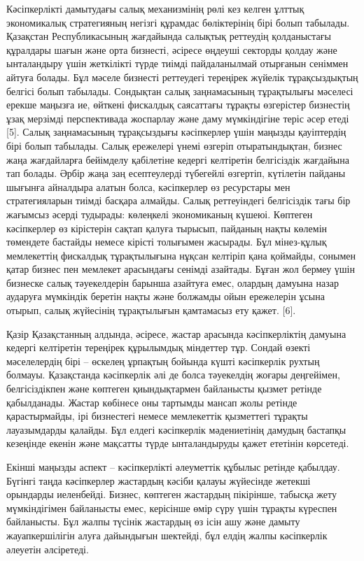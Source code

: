 \begin{multicols}{2}
Кәсіпкерлікті дамытудағы салық механизмінің рөлі кез келген ұлттық
экономикалық стратегияның негізгі құрамдас бөліктерінің бірі болып
табылады. Қазақстан Республикасының жағдайында салықтық реттеудің
қолданыстағы құралдары шағын және орта бизнесті, әсіресе өңдеуші
секторды қолдау және ынталандыру үшін жеткілікті түрде тиімді
пайдаланылмай отырғанын сеніммен айтуға болады. Бұл мәселе бизнесті
реттеудегі тереңірек жүйелік тұрақсыздықтың белгісі болып табылады.
Сондықтан салық заңнамасының тұрақтылығы мәселесі ерекше маңызға ие,
өйткені фискалдық саясаттағы тұрақты өзгерістер бизнестің ұзақ мерзімді
перспективада жоспарлау және даму мүмкіндігіне теріс әсер етеді {[}5{]}.
Салық заңнамасының тұрақсыздығы кәсіпкерлер үшін маңызды қауіптердің
бірі болып табылады. Салық ережелері үнемі өзгеріп отыратындықтан,
бизнес жаңа жағдайларға бейімделу қабілетіне кедергі келтіретін
белгісіздік жағдайына тап болады. Әрбір жаңа заң есептеулерді түбегейлі
өзгертіп, күтілетін пайданы шығынға айналдыра алатын болса, кәсіпкерлер
өз ресурстары мен стратегияларын тиімді басқара алмайды. Салық
реттеуіндегі белгісіздік тағы бір жағымсыз әсерді тудырады: көлеңкелі
экономиканың күшеюі. Көптеген кәсіпкерлер өз кірістерін сақтап қалуға
тырысып, пайданың нақты көлемін төмендете бастайды немесе кірісті
толығымен жасырады. Бұл мінез-құлық мемлекеттің фискалдық тұрақтылығына
нұқсан келтіріп қана қоймайды, сонымен қатар бизнес пен мемлекет
арасындағы сенімді азайтады. Бұған жол бермеу үшін бизнеске салық
тәуекелдерін барынша азайтуға емес, олардың дамуына назар аударуға
мүмкіндік беретін нақты және болжамды ойын ережелерін ұсына отырып,
салық жүйесінің тұрақтылығын қамтамасыз ету қажет. {[}6{]}.

Қазір Қазақстанның алдында, әсіресе, жастар арасында кәсіпкерліктің
дамуына кедергі келтіретін тереңірек құрылымдық міндеттер тұр. Сондай
өзекті мәселелердің бірі -- өскелең ұрпақтың бойында күшті кәсіпкерлік
рухтың болмауы. Қазақстанда кәсіпкерлік әлі де болса тәуекелдің жоғары
деңгейімен, белгісіздікпен және көптеген қиындықтармен байланысты қызмет
ретінде қабылданады. Жастар көбінесе оны тартымды мансап жолы ретінде
қарастырмайды, ірі бизнестегі немесе мемлекеттік қызметтегі тұрақты
лауазымдарды қалайды. Бұл елдегі кәсіпкерлік мәдениетінің дамудың
бастапқы кезеңінде екенін және мақсатты түрде ынталандыруды қажет
ететінін көрсетеді.

Екінші маңызды аспект -- кәсіпкерлікті әлеуметтік құбылыс ретінде
қабылдау. Бүгінгі таңда кәсіпкерлер жастардың кәсіби қалауы жүйесінде
жетекші орындарды иеленбейді. Бизнес, көптеген жастардың пікірінше,
табысқа жету мүмкіндігімен байланысты емес, керісінше өмір сүру үшін
тұрақты күреспен байланысты. Бұл жалпы түсінік жастардың өз ісін ашу
және дамыту жауапкершілігін алуға дайындығын шектейді, бұл елдің жалпы
кәсіпкерлік әлеуетін әлсіретеді.


\end{multicols}
